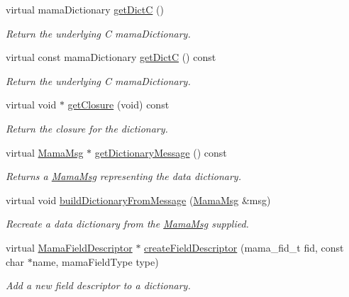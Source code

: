 \begin{DoxyCompactItemize}
virtual mamaDictionary \hyperlink{classWombat_1_1MamaDictionary_aafbd6c9faf6110a56832056153896792}{getDictC} ()
\begin{DoxyCompactList}\small\item\em Return the underlying C mamaDictionary. \item\end{DoxyCompactList}\item 
virtual const mamaDictionary \hyperlink{classWombat_1_1MamaDictionary_a91df6b193f572a92f0c4c0520391c330}{getDictC} () const 
\begin{DoxyCompactList}\small\item\em Return the underlying C mamaDictionary. \item\end{DoxyCompactList}\item 
virtual void $\ast$ \hyperlink{classWombat_1_1MamaDictionary_a7827c7dbb1da954ba37950a56697c2e9}{getClosure} (void) const 
\begin{DoxyCompactList}\small\item\em Return the closure for the dictionary. \item\end{DoxyCompactList}\item 
virtual \hyperlink{classWombat_1_1MamaMsg}{MamaMsg} $\ast$ \hyperlink{classWombat_1_1MamaDictionary_ad1852a80f43d4fc41de56fcac328d3a6}{getDictionaryMessage} () const 
\begin{DoxyCompactList}\small\item\em Returns a \hyperlink{classWombat_1_1MamaMsg}{MamaMsg} representing the data dictionary. \item\end{DoxyCompactList}\item 
virtual void \hyperlink{classWombat_1_1MamaDictionary_a3fa0ae5302f3765479ccc5c923c30c4a}{buildDictionaryFromMessage} (\hyperlink{classWombat_1_1MamaMsg}{MamaMsg} \&msg)
\begin{DoxyCompactList}\small\item\em Recreate a data dictionary from the \hyperlink{classWombat_1_1MamaMsg}{MamaMsg} supplied. \item\end{DoxyCompactList}\item 
virtual \hyperlink{classWombat_1_1MamaFieldDescriptor}{MamaFieldDescriptor} $\ast$ \hyperlink{classWombat_1_1MamaDictionary_a5d4f9d94baee4ae4e7ee8f184f982296}{createFieldDescriptor} (mama\_\-fid\_\-t fid, const char $\ast$name, mamaFieldType type)
\begin{DoxyCompactList}\small\item\em Add a new field descriptor to a dictionary. \item\end{DoxyCompactList}\item 

\end{DoxyCompactItemize}
